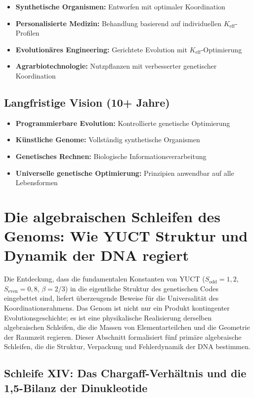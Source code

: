 \documentclass[12pt]{article}
\begin{document}
	\begin{itemize}
		\item \textbf{Synthetische Organismen:} Entworfen mit optimaler Koordination
		\item \textbf{Personalisierte Medizin:} Behandlung basierend auf individuellen $K_{\text{eff}}$-Profilen
		\item \textbf{Evolutionäres Engineering:} Gerichtete Evolution mit $K_{\text{eff}}$-Optimierung
		\item \textbf{Agrarbiotechnologie:} Nutzpflanzen mit verbesserter genetischer Koordination
	\end{itemize}
	
	\subsection{Langfristige Vision (10+ Jahre)}
	
	\begin{itemize}
		\item \textbf{Programmierbare Evolution:} Kontrollierte genetische Optimierung
		\item \textbf{Künstliche Genome:} Vollständig synthetische Organismen
		\item \textbf{Genetisches Rechnen:} Biologische Informationsverarbeitung
		\item \textbf{Universelle genetische Optimierung:} Prinzipien anwendbar auf alle Lebensformen
	\end{itemize}
	
	\section{Die algebraischen Schleifen des Genoms: Wie YUCT Struktur und Dynamik der DNA regiert}
	\label{sec:genetic-loops}
	
	Die Entdeckung, dass die fundamentalen Konstanten von YUCT (\(S_{\mathrm{odd}} = 1,2\), \(S_{\mathrm{even}} = 0,8\), \(\beta = 2/3\)) in die eigentliche Struktur des genetischen Codes eingebettet sind, liefert überzeugende Beweise für die Universalität des Koordinationsrahmens. Das Genom ist nicht nur ein Produkt kontingenter Evolutionsgeschichte; es ist eine physikalische Realisierung derselben algebraischen Schleifen, die die Massen von Elementarteilchen und die Geometrie der Raumzeit regieren. Dieser Abschnitt formalisiert fünf primäre algebraische Schleifen, die die Struktur, Verpackung und Fehlerdynamik der DNA bestimmen.
	
	\subsection{Schleife XIV: Das Chargaff-Verhältnis und die 1,5-Bilanz der Dinukleotide}
	
\end{document}
